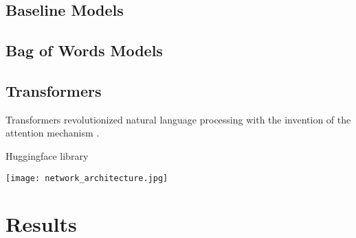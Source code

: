 \documentclass[11pt]{article}
\begin{document}
\subsection{Baseline Models}

\subsection{Bag of Words Models}

\subsection{Transformers}

Transformers revolutionized natural language processing with the invention of the attention mechanism \cite{DBLP:journals/corr/VaswaniSPUJGKP17}.

Huggingface library \cite{DBLP:journals/corr/abs-1910-03771}

\texttt{[image: network\_architecture.jpg]}


\section{Results}
\end{document}
